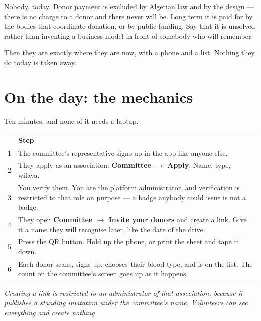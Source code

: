 \documentclass[11pt,a4paper]{article}
\newcommand{\note}[1]{{\small\color{qatraGrey}\textit{#1}}}
\begin{document}
\begin{description}[leftmargin=0em, style=unboxed]
\item[``Who pays for this?''] Nobody, today. Donor payment is excluded by
Algerian law and by the design --- there is no charge to a donor and there never
will be. Long term it is paid for by the bodies that coordinate donation, or by
public funding. Say that it is unsolved rather than inventing a business model
in front of somebody who will remember.

\item[``What if it stops working?''] Then they are exactly where they are now,
with a phone and a list. Nothing they do today is taken away.

\end{description}

\section{On the day: the mechanics}

Ten minutes, and none of it needs a laptop.

\begin{center}
\begin{tabularx}{\textwidth}{@{}rX@{}}
\toprule
& \textbf{Step} \\
\midrule
1 & The committee's representative signs up in the app like anyone else. \\
2 & They apply as an association: \textbf{Committee $\rightarrow$ Apply}.
     Name, type, wilaya. \\
3 & You verify them. You are the platform administrator, and verification is
     restricted to that role on purpose --- a badge anybody could issue is not
     a badge. \\
4 & They open \textbf{Committee $\rightarrow$ Invite your donors} and create
     a link. Give it a name they will recognise later, like the date of the
     drive. \\
5 & Press the QR button. Hold up the phone, or print the sheet and tape it
     down. \\
6 & Each donor scans, signs up, chooses their blood type, and is on the list.
     The count on the committee's screen goes up as it happens. \\
\bottomrule
\end{tabularx}
\end{center}

\note{Creating a link is restricted to an administrator of that association,
because it publishes a standing invitation under the committee's name.
Volunteers can see everything and create nothing.}
\end{document}
